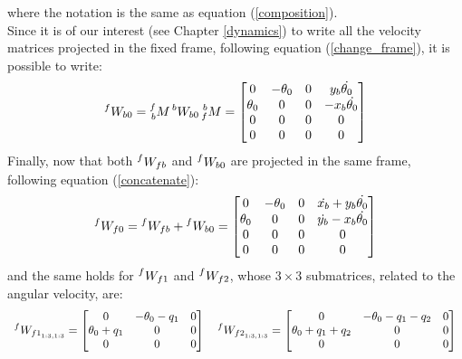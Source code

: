 \documentclass[a4paper,12pt,oneside]{report}
\begin{document}
where the notation is the same as equation (\ref{composition}).\\
Since it is of our interest (see Chapter \ref{dynamics}) to write all the velocity matrices projected in the fixed frame, following equation (\ref{change_frame}), it is possible to write:
\begin{equation}
    \prescript{f}{}{W_{b0}}=\prescript{f}{b}{M}\prescript{b}{}{W_{b0}}\prescript{b}{f}{M}=\begin{bmatrix}
      0&-\theta_0&0&y_b \dot{\theta_0}\\
      \theta_0&0&0&-x_b \dot{\theta_0}\\
      0&0&0&0\\
      0&0&0&0
    \end{bmatrix}
  \label{W_bo}
\end{equation}
Finally, now that both $\prescript{f}{}{W_{fb}}$ and $\prescript{f}{}{W_{b0}}$ are projected in the same frame, following equation (\ref{concatenate}):
\begin{equation}
    \prescript{f}{}{W_{f0}}=\prescript{f}{}{W_{fb}}+\prescript{f}{}{W_{b0}}=\begin{bmatrix}
      0&-\theta_0&0&\dot{x_b}+y_b \dot{\theta_0}\\
      \theta_0&0&0&\dot{y_b}-x_b \dot{\theta_0}\\
      0&0&0&0\\
      0&0&0&0
    \end{bmatrix}
    \label{arm_1_vel}
\end{equation}
and the same holds for $\prescript{f}{}{W_{f1}}$ and $\prescript{f}{}{W_{f2}}$, whose $3\times 3$ submatrices, related to the angular velocity, are:
  \begin{equation}
    \begin{array}{c}
      \prescript{f}{}{W_{{f1}_{1:3,1:3}}}=\begin{bmatrix}
        0&-\theta_0-q_1&0\\
        \theta_0+q_1&0&0\\
        0&0&0
      \end{bmatrix} \quad
      \prescript{f}{}{W_{{f2}_{1:3,1:3}}}=\begin{bmatrix}
        0&-\theta_0-q_1-q_2&0\\
        \theta_0+q_1+q_2&0&0\\
        0&0&0
      \end{bmatrix}
    \end{array}
    \label{arms_velocity}
  \end{equation}
\end{document}
